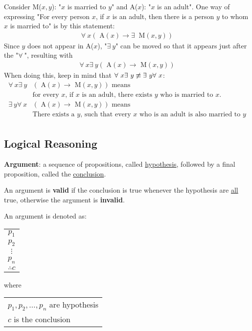 Consider M($x, y$): "$x$ is married to $y$" and A($x$): "$x$ is an adult".
One way of expressing "For every person $x$, if $x$ is an adult, then
there is a person $y$ to whom $x$ is married to" is by this statement:
\begin{align*}
  \forall~ x (\text{ A}(x) \rightarrow \exists~ \text{ M}(x, y))
\end{align*}
Since $y$ does not appear in A($x$), "$\exists~ y$" can be moved so that it appears
just after the "$\forall~$", resulting with
\begin{align*}
  \forall~ x \exists~ y (\text{ A}(x) \rightarrow \text{ M}(x, y))
\end{align*}
When doing this, keep in mind that $\forall~ x \exists~ y \centernot \equiv \exists~ y \forall~ x$:
\begin{align*}
  \forall~ x \exists~ y & (\text{ A}(x) \rightarrow \text{ M}(x, y)) \text{ means}                                 \\
                      & \text{for every $x$, if $x$ is an adult, there exists $y$ who is married to $x$.}     \\
  \exists~ y \forall~ x & (\text{ A}(x) \rightarrow \text{ M}(x, y)) \text{ means}                                 \\
                      & \text{There exists a $y$, such that every $x$ who is an adult is also married to $y$} \\
\end{align*}

\subsection{Logical Reasoning}

\textbf{Argument}: a sequence of propositions, called \underline{hypothesis}, followed
by a final proposition, called the \underline{conclusion}.

An argument is \textbf{valid} if the conclusion is true whenever the hypothesis
are \underline{all} true, otherwise the argument is \textbf{invalid}.

\begin{center}
  An argument is denoted as:
  \begin{tabular}{c}
    $p_1$     \\
    $p_2$     \\
    $\vdots $ \\
    $p_n$     \\
    \hline
    $\therefore c$
  \end{tabular}
  where
  \begin{tabular}{l}
    $p_1, p_2, \ldots, p_n$ are hypothesis \\
    $c$ is the conclusion
  \end{tabular}
\end{center}

